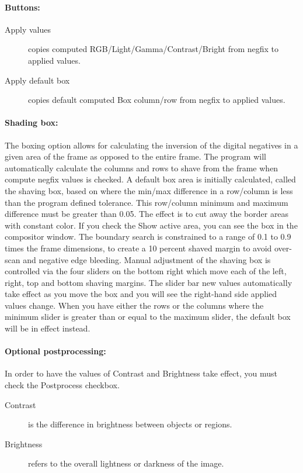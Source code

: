 \paragraph{Buttons:}
    \begin{description}
        \item[Apply values] copies computed RGB/Light/Gamma/Contrast/Bright from negfix to applied values.
        \item[Apply default box] copies default computed Box column/row from negfix to applied values.
    \end{description}
\paragraph{Shading box:} The boxing option allows for calculating the inversion of the digital negatives in a given area of the frame as opposed to the entire frame. The program will automatically calculate the columns and rows to shave from the frame when compute negfix values is checked. A default box area is initially calculated, called the shaving box, based on where the min/max difference in a row/column is less than the program defined tolerance. This row/column minimum and maximum difference must be greater than 0.05. The effect is to cut away the border areas with constant color. If you check the Show active area, you can see the box in the compositor window. The boundary search is constrained to a range of 0.1 to 0.9 times the frame dimensions, to create a 10 percent shaved margin to avoid over-scan and negative edge bleeding. Manual adjustment of the shaving box is controlled via the four sliders on the bottom right which move each of the left, right, top and bottom shaving margins. The slider bar new values automatically take effect as you move the box and you will see the right-hand side applied values change. When you have either the rows or the columns where the minimum slider is greater than or equal to the maximum slider, the default box will be in effect instead.

\paragraph{Optional postprocessing:} In order to have the values of Contrast and Brightness take effect, you must check the Postprocess checkbox.
\begin{description}
    \item[Contrast] is the difference in brightness between objects or regions.
    \item[Brightness] refers to the overall lightness or darkness of the image.
\end{description}

